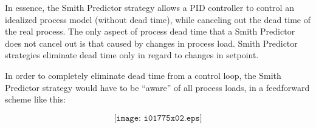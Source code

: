 In essence, the Smith Predictor strategy allows a PID controller to control an idealized process model (without dead time), while canceling out the dead time of the real process.  The only aspect of process dead time that a Smith Predictor does not cancel out is that caused by changes in process load.  Smith Predictor strategies eliminate dead time only in regard to changes in setpoint.

In order to completely eliminate dead time from a control loop, the Smith Predictor strategy would have to be ``aware'' of all process loads, in a feedforward scheme like this:

$$\texttt{[image: i01775x02.eps]}$$




